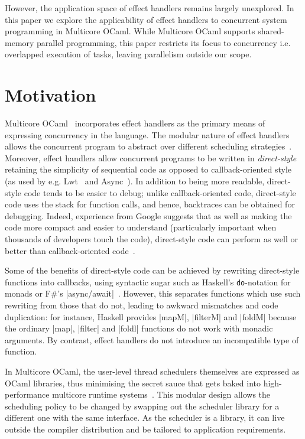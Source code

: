 \documentclass{llncs}
\begin{document}
However, the application space of effect handlers remains largely unexplored. In
this paper we explore the applicability of effect handlers to concurrent system
programming in Multicore OCaml. While Multicore OCaml supports shared-memory
parallel programming, this paper restricts its focus to concurrency i.e.
overlapped execution of tasks, leaving parallelism outside our scope.

\section{Motivation}

Multicore OCaml~\citep*{DolanWM14} incorporates effect handlers as the primary
means of expressing concurrency in the language. The modular nature of effect
handlers allows the concurrent program to abstract over different scheduling
strategies~\citep*{DolanWSYM15}. Moreover, effect handlers allow concurrent
programs to be written in \emph{direct-style} retaining the simplicity of
sequential code as opposed to callback-oriented style (as used by e.g.
Lwt~\citep*{Vouillon08} and Async~\citep*{Minsky13}). In addition to being more
readable, direct-style code tends to be easier to debug; unlike
callback-oriented code, direct-style code uses the stack for function calls, and
hence, backtraces can be obtained for debugging. Indeed, experience from Google
suggests that as well as making the code more compact and easier to understand
(particularly important when thousands of developers touch the code),
direct-style code can perform as well or better than callback-oriented
code~\citep*{Barroso2017}.

Some of the benefits of direct-style code can be achieved by rewriting
direct-style functions into callbacks, using syntactic sugar
such as Haskell's \verb|do|-notation for monads or F\#'s
|async/await|~\citep*{syme2011fsharp}.  However, this separates functions which
use such rewriting from those that do not, leading to awkward mismatches and
code duplication: for instance, Haskell
provides |mapM|, |filterM| and |foldM| because the ordinary |map|, |filter| and
|foldl| functions do not work with monadic arguments. By contrast, effect
handlers do not introduce an incompatible type of function.

In Multicore OCaml, the user-level thread schedulers themselves are expressed
as OCaml libraries, thus minimising the secret sauce that gets baked into
high-performance multicore runtime systems~\citep*{KcHMP16}. This modular
design allows the scheduling policy to be changed by swapping out the
scheduler library for a different one with the same interface. As the
scheduler is a library, it can live outside the compiler distribution and
be tailored to application requirements.
\end{document}
